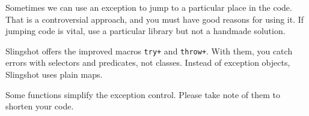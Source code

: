 Sometimes we can use an exception to jump to a particular place in the code. That is a controversial approach, and you must have good reasons for using it. If jumping code is vital, use a particular library but not a handmade solution.

Slingshot offers the improved macros \verb|try+| and \verb|throw+|. With them, you catch errors with selectors and predicates, not classes. Instead of exception objects, Slingshot uses plain maps.

Some functions simplify the exception control. Please take note of them to shorten your code.
